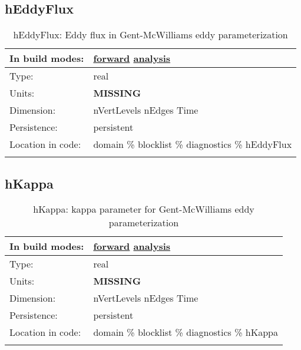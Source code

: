 \subsection[hEddyFlux]{hEddyFlux}
\label{subsec:var_sec_diagnostics_hEddyFlux}
\begin{center}
\begin{longtable}{| p{2.0in} | p{4.0in} |}
        \hline 
        In build modes: & \hyperref[subsec:forward_var_tab_diagnostics]{forward} \hyperref[subsec:analysis_var_tab_diagnostics]{analysis} \\
        \hline 
        Type: & real \\
        \hline 
        Units: & {\bf \color{red} MISSING} \\
        \hline 
        Dimension: & nVertLevels nEdges Time \\
        \hline 
        Persistence: & persistent \\
        \hline 
		 Location in code: & domain \% blocklist \% diagnostics \% hEddyFlux \\
		 \hline 
    \caption{hEddyFlux: Eddy flux in Gent-McWilliams eddy parameterization}
\end{longtable}
\end{center}
\subsection[hKappa]{hKappa}
\label{subsec:var_sec_diagnostics_hKappa}
\begin{center}
\begin{longtable}{| p{2.0in} | p{4.0in} |}
        \hline 
        In build modes: & \hyperref[subsec:forward_var_tab_diagnostics]{forward} \hyperref[subsec:analysis_var_tab_diagnostics]{analysis} \\
        \hline 
        Type: & real \\
        \hline 
        Units: & {\bf \color{red} MISSING} \\
        \hline 
        Dimension: & nVertLevels nEdges Time \\
        \hline 
        Persistence: & persistent \\
        \hline 
		 Location in code: & domain \% blocklist \% diagnostics \% hKappa \\
		 \hline 
    \caption{hKappa: kappa parameter for Gent-McWilliams eddy parameterization}
\end{longtable}
\end{center}
